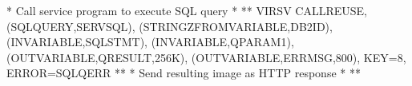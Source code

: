 \documentclass[letterpaper,10pt,english]{sphinxmanual}
\begin{document}
\begin{sphinxVerbatim}[commandchars=\\\{\}]
* Call service program to execute SQL query                           *
*\PYGZhy{}\PYGZhy{}\PYGZhy{}\PYGZhy{}\PYGZhy{}\PYGZhy{}\PYGZhy{}\PYGZhy{}\PYGZhy{}\PYGZhy{}\PYGZhy{}\PYGZhy{}\PYGZhy{}\PYGZhy{}\PYGZhy{}\PYGZhy{}\PYGZhy{}\PYGZhy{}\PYGZhy{}\PYGZhy{}\PYGZhy{}\PYGZhy{}\PYGZhy{}\PYGZhy{}\PYGZhy{}\PYGZhy{}\PYGZhy{}\PYGZhy{}\PYGZhy{}\PYGZhy{}\PYGZhy{}\PYGZhy{}\PYGZhy{}\PYGZhy{}\PYGZhy{}\PYGZhy{}\PYGZhy{}\PYGZhy{}\PYGZhy{}\PYGZhy{}\PYGZhy{}\PYGZhy{}\PYGZhy{}\PYGZhy{}\PYGZhy{}\PYGZhy{}\PYGZhy{}\PYGZhy{}\PYGZhy{}\PYGZhy{}\PYGZhy{}\PYGZhy{}\PYGZhy{}\PYGZhy{}\PYGZhy{}\PYGZhy{}\PYGZhy{}\PYGZhy{}\PYGZhy{}\PYGZhy{}\PYGZhy{}\PYGZhy{}\PYGZhy{}\PYGZhy{}\PYGZhy{}\PYGZhy{}\PYGZhy{}\PYGZhy{}\PYGZhy{}*
   VIRSV\PYGZdl{} CALL\PYGZhy{}REUSE,(\PYGZsq{}SQLQUERY\PYGZsq{},\PYGZsq{}SERVSQL\PYGZsq{}),                     \PYGZhy{}
         (STRINGZ\PYGZhy{}FROM\PYGZhy{}VARIABLE,\PYGZsq{}DB2ID\PYGZsq{}),                        \PYGZhy{}
         (IN\PYGZhy{}VARIABLE,\PYGZsq{}SQLSTMT\PYGZsq{}),                                \PYGZhy{}
         (IN\PYGZhy{}VARIABLE,\PYGZsq{}QPARAM1\PYGZsq{}),                                \PYGZhy{}
         (OUT\PYGZhy{}VARIABLE,\PYGZsq{}QRESULT\PYGZsq{},256K),                          \PYGZhy{}
         (OUT\PYGZhy{}VARIABLE,\PYGZsq{}ERRMSG\PYGZsq{},800),                            \PYGZhy{}
         KEY=8,                                                  \PYGZhy{}
         ERROR=SQLQERR
*\PYGZhy{}\PYGZhy{}\PYGZhy{}\PYGZhy{}\PYGZhy{}\PYGZhy{}\PYGZhy{}\PYGZhy{}\PYGZhy{}\PYGZhy{}\PYGZhy{}\PYGZhy{}\PYGZhy{}\PYGZhy{}\PYGZhy{}\PYGZhy{}\PYGZhy{}\PYGZhy{}\PYGZhy{}\PYGZhy{}\PYGZhy{}\PYGZhy{}\PYGZhy{}\PYGZhy{}\PYGZhy{}\PYGZhy{}\PYGZhy{}\PYGZhy{}\PYGZhy{}\PYGZhy{}\PYGZhy{}\PYGZhy{}\PYGZhy{}\PYGZhy{}\PYGZhy{}\PYGZhy{}\PYGZhy{}\PYGZhy{}\PYGZhy{}\PYGZhy{}\PYGZhy{}\PYGZhy{}\PYGZhy{}\PYGZhy{}\PYGZhy{}\PYGZhy{}\PYGZhy{}\PYGZhy{}\PYGZhy{}\PYGZhy{}\PYGZhy{}\PYGZhy{}\PYGZhy{}\PYGZhy{}\PYGZhy{}\PYGZhy{}\PYGZhy{}\PYGZhy{}\PYGZhy{}\PYGZhy{}\PYGZhy{}\PYGZhy{}\PYGZhy{}\PYGZhy{}\PYGZhy{}\PYGZhy{}\PYGZhy{}\PYGZhy{}\PYGZhy{}*
* Send resulting image as HTTP response                               *
*\PYGZhy{}\PYGZhy{}\PYGZhy{}\PYGZhy{}\PYGZhy{}\PYGZhy{}\PYGZhy{}\PYGZhy{}\PYGZhy{}\PYGZhy{}\PYGZhy{}\PYGZhy{}\PYGZhy{}\PYGZhy{}\PYGZhy{}\PYGZhy{}\PYGZhy{}\PYGZhy{}\PYGZhy{}\PYGZhy{}\PYGZhy{}\PYGZhy{}\PYGZhy{}\PYGZhy{}\PYGZhy{}\PYGZhy{}\PYGZhy{}\PYGZhy{}\PYGZhy{}\PYGZhy{}\PYGZhy{}\PYGZhy{}\PYGZhy{}\PYGZhy{}\PYGZhy{}\PYGZhy{}\PYGZhy{}\PYGZhy{}\PYGZhy{}\PYGZhy{}\PYGZhy{}\PYGZhy{}\PYGZhy{}\PYGZhy{}\PYGZhy{}\PYGZhy{}\PYGZhy{}\PYGZhy{}\PYGZhy{}\PYGZhy{}\PYGZhy{}\PYGZhy{}\PYGZhy{}\PYGZhy{}\PYGZhy{}\PYGZhy{}\PYGZhy{}\PYGZhy{}\PYGZhy{}\PYGZhy{}\PYGZhy{}\PYGZhy{}\PYGZhy{}\PYGZhy{}\PYGZhy{}\PYGZhy{}\PYGZhy{}\PYGZhy{}\PYGZhy{}*

\end{sphinxVerbatim}
\end{document}
